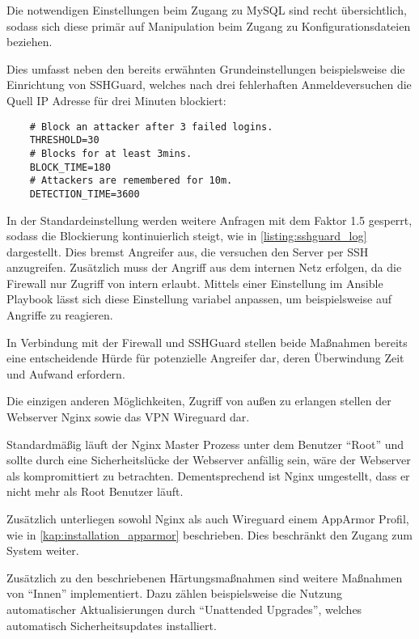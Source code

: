 Die notwendigen Einstellungen beim Zugang zu MySQL sind recht übersichtlich, sodass sich diese primär auf Manipulation beim Zugang zu Konfigurationsdateien beziehen.

Dies umfasst neben den bereits erwähnten Grundeinstellungen beispielsweise die Einrichtung von SSHGuard, welches nach drei fehlerhaften Anmeldeversuchen die Quell IP Adresse für drei Minuten blockiert:

\begin{verbatim}
	# Block an attacker after 3 failed logins.
	THRESHOLD=30
	# Blocks for at least 3mins.
	BLOCK_TIME=180
	# Attackers are remembered for 10m.
	DETECTION_TIME=3600
\end{verbatim}

In der Standardeinstellung werden weitere Anfragen mit dem Faktor 1.5 gesperrt, sodass die Blockierung kontinuierlich steigt, wie in \autoref{listing:sshguard_log} dargestellt. Dies bremst Angreifer aus, die versuchen den Server per SSH anzugreifen. Zusätzlich muss der Angriff aus dem internen Netz erfolgen, da die Firewall nur Zugriff von intern erlaubt. Mittels einer Einstellung im Ansible Playbook lässt sich diese Einstellung variabel anpassen, um beispielsweise auf Angriffe zu reagieren.

In Verbindung mit der Firewall und SSHGuard stellen beide Maßnahmen bereits eine entscheidende Hürde für potenzielle Angreifer dar, deren Überwindung Zeit und Aufwand erfordern.

Die einzigen anderen Möglichkeiten, Zugriff von außen zu erlangen stellen der Webserver Nginx sowie das \ac{VPN} Wireguard dar.

Standardmäßig läuft der Nginx Master Prozess unter dem Benutzer \enquote{Root} und sollte durch eine Sicherheitslücke der Webserver anfällig sein, wäre der Webserver als kompromittiert zu betrachten. Dementsprechend ist Nginx umgestellt, dass er nicht mehr als Root Benutzer läuft.

Zusätzlich unterliegen sowohl Nginx als auch Wireguard einem AppArmor Profil, wie in \autoref{kap:installation_apparmor} beschrieben. Dies beschränkt den Zugang zum System weiter.

Zusätzlich zu den beschriebenen Härtungsmaßnahmen sind weitere Maßnahmen von \enquote{Innen} implementiert. Dazu zählen beispielsweise die Nutzung automatischer Aktualisierungen durch \enquote{Unattended Upgrades}, welches automatisch Sicherheitsupdates installiert.

